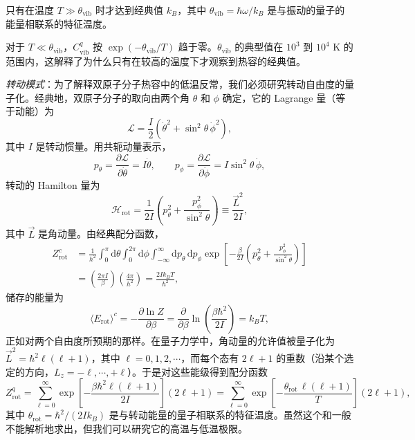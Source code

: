只有在温度 $T\gg\theta_{\text{vib}}$ 时才达到经典值 $k_B$，其中 $\theta_{\text{vib}}=\hbar\omega/k_B$ 是与振动的量子的能量相联系的特征温度。



对于 $T\ll\theta_{\text{vib}}$，$C^q_{\text{vib}}$ 按 $\exp(-\theta_{\text{vib}}/T)$ 趋于零。$\theta_{\text{vib}}$ 的典型值在 $10^3$ 到 $10^4$ K 的范围内，这解释了为什么只有在较高的温度下才观察到热容的经典值。

\emph{转动模式}：为了解释双原子分子热容中的低温反常，我们必须研究转动自由度的量子化。经典地，双原子分子的取向由两个角 $\theta$ 和 $\phi$ 确定，它的 Lagrange 量（等于动能）为
\begin{equation}\label{eq:6.14}
\mathscr L=\frac I2\left(\dot\theta^2+\sin^2\theta\,\dot\phi^2\right),
\end{equation}
其中 $I$ 是转动惯量。用共轭动量表示，
\begin{equation}\label{eq:6.15}
p_\theta=\frac{\partial\mathscr L}{\partial\dot\theta}=I\dot\theta,\qquad p_\phi=\frac{\partial\mathscr L}{\partial\dot\phi}=I\sin^2\theta\,\dot\phi,
\end{equation}
转动的 Hamilton 量为
\begin{equation}\label{eq:6.16}
\mathscr H_{\text{rot}}=\frac1{2I}\left(p_\theta^2+\frac{p_\phi^2}{\sin^2\theta}\right)\equiv\frac{\vec L^2}{2I},
\end{equation}
其中 $\vec L$ 是角动量。由经典配分函数，
\begin{equation}\label{eq:6.17}
\begin{aligned}
Z^c_{\text{rot}}&=\frac1{h^2}\int_0^\pi\mathrm d\theta\int_0^{2\pi}\mathrm d\phi\int_{-\infty}^{\infty}\mathrm dp_\theta\,\mathrm dp_\phi\exp\left[-\frac\beta{2I}\left(p_\theta^2+\frac{p_\phi^2}{\sin^2\theta}\right)\right]\\
&=\left(\frac{2\pi I}{\beta}\right)\left(\frac{4\pi}{h^2}\right)=\frac{2Ik_BT}{\hbar^2},
\end{aligned}
\end{equation}
储存的能量为
\begin{equation}\label{eq:6.18}
\langle E_{\text{rot}}\rangle^c=-\frac{\partial\ln Z}{\partial\beta}=\frac{\partial}{\partial\beta}\ln\left(\frac{\beta\hbar^2}{2I}\right)=k_BT,
\end{equation}
正如对两个自由度所预期的那样。在量子力学中，角动量的允许值被量子化为 $\vec L^2=\hbar^2\ell(\ell+1)$，其中 $\ell=0,1,2,\cdots$，而每个态有 $2\ell+1$ 的重数（沿某个选定的方向，$L_z=-\ell,\cdots,+\ell$）。于是对这些能级得到配分函数
\begin{equation}\label{eq:6.19}
Z^q_{\text{rot}}=\sum_{\ell=0}^{\infty}\exp\left[-\frac{\beta\hbar^2\ell(\ell+1)}{2I}\right](2\ell+1)=\sum_{\ell=0}^{\infty}\exp\left[-\frac{\theta_{\text{rot}}\,\ell(\ell+1)}{T}\right](2\ell+1),
\end{equation}
其中 $\theta_{\text{rot}}=\hbar^2/(2Ik_B)$ 是与转动能量的量子相联系的特征温度。虽然这个和一般不能解析地求出，但我们可以研究它的高温与低温极限。

